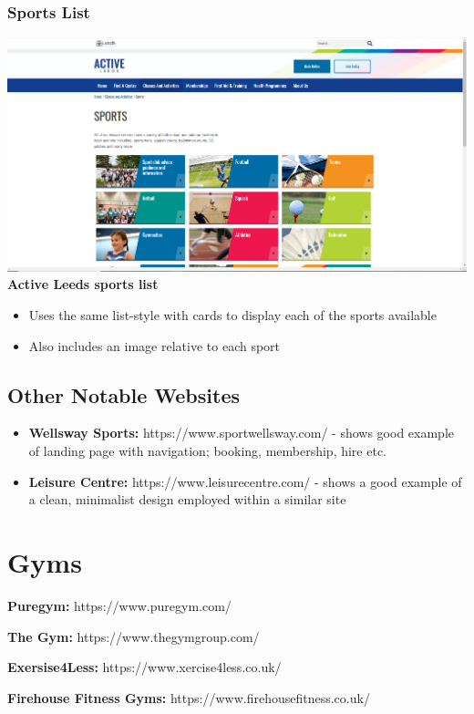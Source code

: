 \documentclass[12pt,a4paper]{article}
\begin{document}
\subsubsection{Sports List}
\begin{center}
	\includegraphics[width=0.7\linewidth]{img/leeds-city-council-sports-list.png}\\
	\textbf{Active Leeds sports list}
\end{center}

\begin{itemize}
	\item Uses the same list-style with cards to display each of the sports  available 
	
	\item Also includes an image relative to each sport 
\end{itemize}


\subsection{Other Notable Websites}

\begin{itemize}
	\item \textbf{Wellsway Sports:} https://www.sportwellsway.com/ - shows good example of landing page with navigation; booking, membership, hire etc.
	
	\item \textbf{Leisure Centre:} https://www.leisurecentre.com/ - shows a good example of a clean, minimalist design employed within a similar site 
\end{itemize}

\section{Gyms}

\begin{center}
	\textbf{Puregym:} https://www.puregym.com/
	
	\textbf{The Gym:} https://www.thegymgroup.com/
	
	\textbf{Exersise4Less:} https://www.xercise4less.co.uk/
	
	\textbf{Firehouse Fitness Gyms:} https://www.firehousefitness.co.uk/
\end{center}
\end{document}
